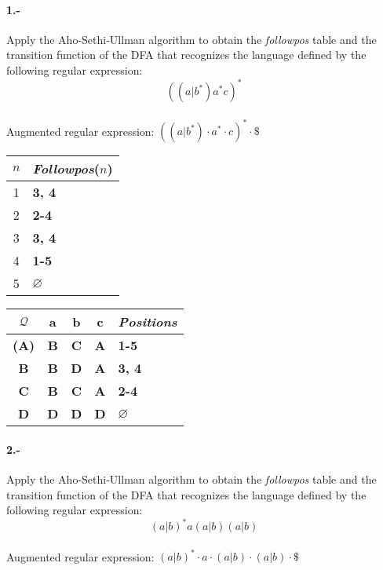 \documentclass[11pt,a4paper,table,answers]{exam} %
\newcommand{\h}[1]{\ifprintanswers\textcolor{azul}{\bf#1}\else{\phantom{\bf#1}}\fi}
\newlength{\graphicheigth}
\newcommand{\myincludegraphicssol}[1]{%
    \sbox{\graphicbox}{%
        \begin{adjustbox}{max size={\textwidth}{\textheight}}
            \texttt{[image: \#1]}
        \end{adjustbox}
    }
    \settoheight{\graphicheigth}{\usebox{\graphicbox}}
    \addtolength{\graphicheigth}{4ex} %
    \ifprintanswers
        \begin{center}
            \usebox{\graphicbox}
        \end{center} 
    \else
        \makeemptybox{\graphicheigth}
    \fi
}
\begin{document}
\paragraph{1.-}\label{p1}
Apply the Aho-Sethi-Ullman algorithm to obtain the \emph{followpos} table and the transition function of the DFA that recognizes the language defined by the following regular expression:
\[
    ((a|b^*)a^*c)^*
\]
~\\
Augmented regular expression: \h{$ ((a|b^*)\cdot a^*\cdot c)^*\cdot \$  $} \\

\myincludegraphicssol{}
\begin{tabular} {c@{\hspace{4mm}}l}
\toprule %
$n$ & \emph{Followpos}($n$) \\
\midrule %
1 & \h{3, 4} \\ 
2 & \h{2-4} \\ 
3 & \h{3, 4} \\ 
4 & \h{1-5} \\ 
5 & \h{$\varnothing$} \\ 
\bottomrule %
\end{tabular}
\quad
{}
\begin{tabular} {c@{\hspace{4mm}}ccc@{\hspace{4mm}}l}
\toprule %
$\mathcal{Q}$ & a & b & c & \emph{Positions}\\ 
\midrule %
\h{(A)} & \h{B} & \h{C} & \h{A} & \h{1-5}\\ 
\h{B} & \h{B} & \h{D} & \h{A} & \h{3, 4}\\ 
\h{C} & \h{B} & \h{C} & \h{A} & \h{2-4}\\ 
\h{D} & \h{D} & \h{D} & \h{D} & \h{$\varnothing$}\\ 
\bottomrule %
\end{tabular}

\paragraph{2.-}\label{p2}
Apply the Aho-Sethi-Ullman algorithm to obtain the \emph{followpos} table and the transition function of the DFA that recognizes the language defined by the following regular expression:
\[
    (a|b)^*a(a|b)(a|b)
\]
~\\
Augmented regular expression: \h{$ (a|b)^*\cdot a\cdot (a|b)\cdot (a|b)\cdot \$  $} \\
\end{document}
